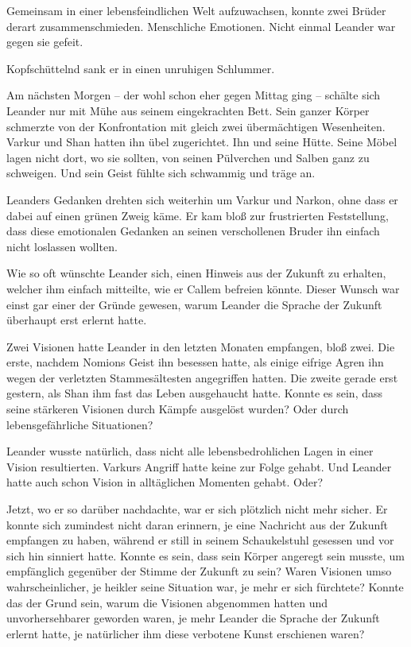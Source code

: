 Gemeinsam in einer lebensfeindlichen Welt aufzuwachsen, konnte zwei Brüder derart zusammenschmieden. Menschliche Emotionen. Nicht einmal Leander war gegen sie gefeit.

Kopfschüttelnd sank er in einen unruhigen Schlummer.



\trennzeichen



Am nächsten Morgen – der wohl schon eher gegen Mittag ging – schälte sich Leander nur mit Mühe aus seinem eingekrachten Bett. Sein ganzer Körper schmerzte von der Konfrontation mit gleich zwei übermächtigen Wesenheiten. Varkur und Shan hatten ihn übel zugerichtet. Ihn und seine Hütte. Seine Möbel lagen nicht dort, wo sie sollten, von seinen Pülverchen und Salben ganz zu schweigen. Und sein Geist fühlte sich schwammig und träge an.

Leanders Gedanken drehten sich weiterhin um Varkur und Narkon, ohne dass er dabei auf einen grünen Zweig käme. Er kam bloß zur frustrierten Feststellung, dass diese emotionalen Gedanken an seinen verschollenen Bruder ihn einfach nicht loslassen wollten.

Wie so oft wünschte Leander sich, einen Hinweis aus der Zukunft zu erhalten, welcher ihm einfach mitteilte, wie er Callem befreien könnte. Dieser Wunsch war einst gar einer der Gründe gewesen, warum Leander die Sprache der Zukunft überhaupt erst erlernt hatte.

Zwei Visionen hatte Leander in den letzten Monaten empfangen, bloß zwei. Die erste, nachdem Nomions Geist ihn besessen hatte, als einige eifrige Agren ihn wegen der verletzten Stammesältesten angegriffen hatten. Die zweite gerade erst gestern, als Shan ihm fast das Leben ausgehaucht hatte. Konnte es sein, dass seine stärkeren Visionen durch Kämpfe ausgelöst wurden? Oder durch lebensgefährliche Situationen?

Leander wusste natürlich, dass nicht alle lebensbedrohlichen Lagen in einer Vision resultierten. Varkurs Angriff hatte keine zur Folge gehabt. Und Leander hatte auch schon Vision in alltäglichen Momenten gehabt. Oder?

Jetzt, wo er so darüber nachdachte, war er sich plötzlich nicht mehr sicher. Er konnte sich zumindest nicht daran erinnern, je eine Nachricht aus der Zukunft empfangen zu haben, während er still in seinem Schaukelstuhl gesessen und vor sich hin sinniert hatte. Konnte es sein, dass sein Körper angeregt sein musste, um empfänglich gegenüber der Stimme der Zukunft zu sein? Waren Visionen umso wahrscheinlicher, je heikler seine Situation war, je mehr er sich fürchtete? Konnte das der Grund sein, warum die Visionen abgenommen hatten und unvorhersehbarer geworden waren, je mehr Leander die Sprache der Zukunft erlernt hatte, je natürlicher ihm diese verbotene Kunst erschienen waren?

